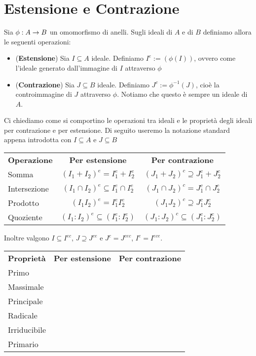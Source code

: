 \documentclass[a4paper,GeneralMath,NoNotes]{stdmdoc}
\begin{document}
	\section*{Estensione e Contrazione}
	Sia $\phi: A \rightarrow B$ un omomorfismo di anelli. Sugli ideali di $A$ e di $B$ definiamo allora le seguenti operazioni: \\
	\begin{itemize}
		\item ({\bf Estensione}) Sia $I \subseteq A$ ideale. Definiamo $I^e := (\phi(I))$, ovvero come l'ideale generato dall'immagine di $I$ attraverso $\phi$
		\item ({\bf Contrazione}) Sia $J \subseteq B$ ideale. Definiamo $J^c := \phi^{-1}(J)$, cioè la controimmagine di $J$ attraverso $\phi$. Notiamo che questo è sempre un ideale di $A$.
	\end{itemize}
	Ci chiediamo come si comportino le operazioni tra ideali e le proprietà degli ideali per contrazione e per estensione. Di seguito useremo la notazione standard appena introdotta con $I \subseteq A$ e $J \subseteq B$
	\vskip 0.3cm \begin{tabular}{lcc}
	{\bf Operazione} & {\bf Per estensione}                          & {\bf Per contrazione}                   \\
	Somma            & $(I_1 + I_2)^e = I_1^e + I_2^e$               & $(J_1 + J_2)^c \supseteq J_1^c + J_2^c$ \\
	Intersezione     & $(I_1 \cap I_2)^e \subseteq I_1^e \cap I_2^e$ & $(J_1 \cap J_2)^c = J_1^c \cap J_2^c$   \\
	Prodotto         & $(I_1 I_2)^e = I_1^e I_2^e$                   & $(J_1 J_2)^c \supseteq J_1^c J_2^c$     \\
	Quoziente        & $(I_1:I_2)^e \subseteq (I_1^e : I_2^e)$       & $(J_1:J_2)^c \subseteq (J_1^c : J_2^c)$ \\
	\end{tabular} \vskip 0.3cm
	Inoltre valgono $I \subseteq I^{ec}$, $J \supseteq J^{ce}$ e $J^c = J^{cec}$, $I^e = I^{ece}$. \\
	
	\vskip 0.5cm \begin{tabular}{lcc}
	{\bf Proprietà} & {\bf Per estensione} & {\bf Per contrazione} \\
	Primo           &                      &                       \\
	Massimale       &                      &                       \\
	Principale      &                      &                       \\
	Radicale        &                      &                       \\
	Irriducibile    &                      &                       \\
	Primario        &                      &                       \\
	\end{tabular} \vskip 0.3cm
\end{document}
